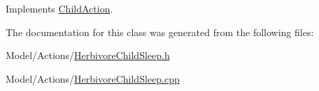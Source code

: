 Implements \hyperlink{class_child_action_ab079f9b34939cb040e129c7966222bbd}{Child\+Action}.



The documentation for this class was generated from the following files\+:\begin{DoxyCompactItemize}
\item 
Model/\+Actions/\hyperlink{_herbivore_child_sleep_8h}{Herbivore\+Child\+Sleep.\+h}\item 
Model/\+Actions/\hyperlink{_herbivore_child_sleep_8cpp}{Herbivore\+Child\+Sleep.\+cpp}\end{DoxyCompactItemize}
